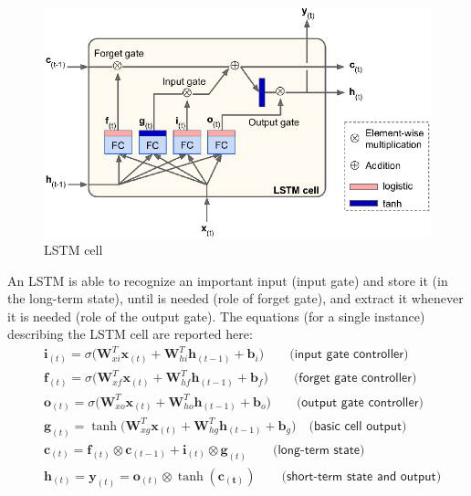 \vspace{-0.3cm}
\begin{figure}[H]
    \centering
    \includegraphics[scale=0.7]{img/LSTM.png}
    \caption{LSTM cell}
\end{figure}
\vspace{-0.3cm}
\noindent
An LSTM is able to recognize an important input (input gate) and store it (in the long-term state), until is needed (role of forget gate), and extract it whenever it is needed (role of the output gate). The equations (for a single instance) describing the LSTM cell are reported here: 
\begin{align}
    &\mathbf{i}_{(t)} = \sigma\big(
        \mathbf{W}_{xi}^T \mathbf{x}_{(t)}+
        \mathbf{W}_{hi}^T \mathbf{h}_{(t-1)} + \mathbf{b}_i    
    \big) \qquad \textsf{(input gate controller)}\\
    &\mathbf{f}_{(t)} = \sigma\big(
        \mathbf{W}_{xf}^T \mathbf{x}_{(t)}+
        \mathbf{W}_{hf}^T \mathbf{h}_{(t-1)} + \mathbf{b}_f    
    \big) \qquad \textsf{(forget gate controller)} \\
    &\mathbf{o}_{(t)} = \sigma\big(
        \mathbf{W}_{xo}^T \mathbf{x}_{(t)}+
        \mathbf{W}_{ho}^T \mathbf{h}_{(t-1)} + \mathbf{b}_o    
    \big) \qquad \textsf{(output gate controller)}\\
    &\mathbf{g}_{(t)} = \tanh\big(
        \mathbf{W}_{xg}^T \mathbf{x}_{(t)}+
        \mathbf{W}_{hg}^T \mathbf{h}_{(t-1)} + \mathbf{b}_g    
    \big) \quad \textsf{(basic cell output)}\\
    &\mathbf{c}_{(t)}= \mathbf{f}_{(t)} \otimes \mathbf{c}_{(t-1)} + \mathbf{i}_{(t)}\otimes \mathbf{g}_{(t)} \qquad \textsf{(long-term state)}\\
    &\mathbf{h}_{(t)}=\mathbf{y}_{(t)}=\mathbf{o}_{(t)} \otimes \tanh(\mathbf{c_{(t)}}) \qquad \textsf{(short-term state and output)}
\end{align}

